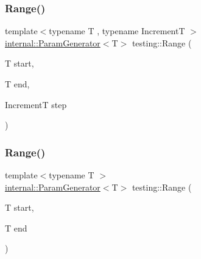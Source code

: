 \mbox{\label{namespacetesting_a265ed70a86cf2d6641582c45ad9529e2}} 
\subsubsection{\texorpdfstring{Range()}{Range()}\hspace{0.1cm}{\footnotesize\ttfamily [1/2]}}
{\footnotesize\ttfamily template$<$typename T , typename IncrementT $>$ \\
\hyperlink{classtesting_1_1internal_1_1ParamGenerator}{internal\+::\+Param\+Generator}$<$T$>$ testing\+::\+Range (\begin{DoxyParamCaption}\item[{T}]{start,  }\item[{T}]{end,  }\item[{IncrementT}]{step }\end{DoxyParamCaption})}

\mbox{\label{namespacetesting_a56a45f85a1238dfc92e6fca03eb3a2e4}} 
\subsubsection{\texorpdfstring{Range()}{Range()}\hspace{0.1cm}{\footnotesize\ttfamily [2/2]}}
{\footnotesize\ttfamily template$<$typename T $>$ \\
\hyperlink{classtesting_1_1internal_1_1ParamGenerator}{internal\+::\+Param\+Generator}$<$T$>$ testing\+::\+Range (\begin{DoxyParamCaption}\item[{T}]{start,  }\item[{T}]{end }\end{DoxyParamCaption})}

\mbox{\label{namespacetesting_a302c84bdc88f2138696da2a4756b6466}} 
